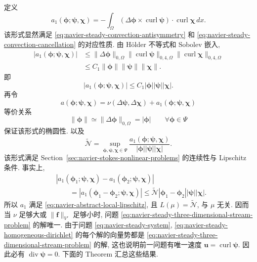 定义
\begin{equation}\label{eq:navier-steady-three-dimensional-trilinear-form}
a_1(\boldsymbol\phi;\boldsymbol\psi,\boldsymbol\chi)
=-\int_\Omega
(\Delta\boldsymbol\phi\times\operatorname{curl}\boldsymbol\psi)
\cdot\operatorname{curl}\boldsymbol\chi\,dx.
\end{equation}
该形式显然满足 \eqref{eq:navier-steady-convection-antisymmetry} 和
\eqref{eq:navier-steady-convection-cancellation} 的对应性质.
由 H\"older 不等式和 Sobolev 嵌入,
\[
\begin{aligned}
|a_1(\boldsymbol\phi;\boldsymbol\psi,\boldsymbol\chi)|
&\leq\|\Delta\boldsymbol\phi\|_{0,\Omega}
\|\operatorname{curl}\boldsymbol\psi\|_{0,4,\Omega}
\|\operatorname{curl}\boldsymbol\chi\|_{0,4,\Omega}\\
&\leq C_1\|\boldsymbol\phi\|
\|\boldsymbol\psi\|\|\boldsymbol\chi\|.
\end{aligned}
\]
即
\begin{equation}\label{eq:navier-steady-three-dimensional-trilinear-bound}
|a_1(\boldsymbol\phi;\boldsymbol\psi,\boldsymbol\chi)|
\leq C_1|\boldsymbol\phi||\boldsymbol\psi||\boldsymbol\chi|.
\end{equation}
再令
\[
a(\boldsymbol\phi;\boldsymbol\psi,\boldsymbol\chi)
=\nu(\Delta\boldsymbol\psi,\Delta\boldsymbol\chi)
+a_1(\boldsymbol\phi;\boldsymbol\psi,\boldsymbol\chi)
\]
等价关系
\[
\|\boldsymbol\phi\|\simeq
\|\Delta\boldsymbol\phi\|_{0,\Omega}=|\boldsymbol\phi|
\qquad\forall\boldsymbol\phi\in\Psi
\]
保证该形式的椭圆性.
以及
\begin{equation}\label{eq:navier-steady-three-dimensional-convection-constant}
\widetilde{\mathcal N}
=\sup_{\boldsymbol\phi,\boldsymbol\psi,\boldsymbol\chi\in\Psi}
\frac{a_1(\boldsymbol\phi;\boldsymbol\psi,\boldsymbol\chi)}
{|\boldsymbol\phi||\boldsymbol\psi||\boldsymbol\chi|}.
\end{equation}
该形式满足 Section~\ref{sec:navier-stokes-nonlinear-problems} 的连续性与
Lipschitz 条件. 事实上,
\[
\begin{aligned}
&|a_1(\boldsymbol\phi_1;\boldsymbol\psi,\boldsymbol\chi)
-a_1(\boldsymbol\phi_2;\boldsymbol\psi,\boldsymbol\chi)|\\
&\qquad=|a_1(\boldsymbol\phi_1-\boldsymbol\phi_2;
\boldsymbol\psi,\boldsymbol\chi)|
\leq\widetilde{\mathcal N}
|\boldsymbol\phi_1-\boldsymbol\phi_2|
|\boldsymbol\psi||\boldsymbol\chi|.
\end{aligned}
\]
所以 $a_1$ 满足 \eqref{eq:navier-abstract-local-lipschitz}, 且
$L(\mu)=\widetilde{\mathcal N}$, 与 $\mu$ 无关. 因而当 $\nu$ 足够大或
$\|\mathbf f\|_{V'}$ 足够小时, 问题
\eqref{eq:navier-steady-three-dimensional-stream-problem} 的解唯一.
由于问题 \eqref{eq:navier-steady-system},
\eqref{eq:navier-steady-homogeneous-dirichlet} 的每个解的向量势都是
\eqref{eq:navier-steady-three-dimensional-stream-problem} 的解, 这也说明前一问题有唯一速度
$\mathbf u=\operatorname{curl}\boldsymbol\psi$. 因此必有
$\operatorname{div}\boldsymbol\psi=0$. 下面的 Theorem 汇总这些结果.

